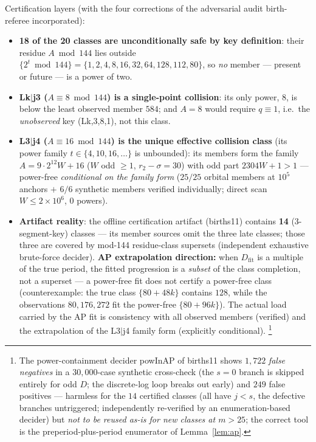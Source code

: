 \documentclass[11pt]{amsart}
\theoremstyle{definition}
\begin{document}
Certification layers (with the four corrections of the adversarial audit
birth-referee incorporated):
\begin{itemize}
\item \textbf{18 of the 20 classes are unconditionally safe by key
definition}: their residue $A\bmod144$ lies outside
$\{2^{t}\bmod144\}=\{1,2,4,8,16,32,64,128,112,80\}$, so \emph{no} member ---
present or future --- is a power of two.
\item \textbf{Lk$|$j3 ($A\equiv8\bmod144$) is a single-point collision}: its
only power, $8$, is below the least observed member $584$; and $A=8$ would
require $q\equiv1$, i.e.\ the \emph{unobserved} key (Lk,3,8,1), not this
class.
\item \textbf{L3$|$j4 ($A\equiv16\bmod144$) is the unique effective
collision class} (its power family $t\in\{4,10,16,\dots\}$ is unbounded): its
members form the family $A=9\cdot2^{12}W+16$ ($W$ odd $\ge1$,
$r_2-\sigma=30$) with odd part $2304W+1>1$ --- power-free \emph{conditional
on the family form} ($25/25$ orbital members at $10^{5}$ anchors $+$ $6/6$
synthetic members verified individually; direct scan $W\le2\times10^{6}$, $0$
powers).
\item \textbf{Artifact reality}: the offline certification artifact
(births11) contains \textbf{14} (3-segment-key) classes --- its member
sources omit the three late classes; those three are covered by mod-144
residue-class supersets (independent exhaustive brute-force decider).
\textbf{AP extrapolation direction:} when $D_{\mathrm{fit}}$ is a multiple of
the true period, the fitted progression is a \emph{subset} of the class
completion, not a superset --- a power-free fit does not certify a power-free
class (counterexample: the true class $\{80+48k\}$ contains $128$, while the
observations $80,176,272$ fit the power-free $\{80+96k\}$). The actual load
carried by the AP fit is consistency with all observed members (verified) and
the extrapolation of the L3$|$j4 family form (explicitly conditional).
\footnote{The power-containment decider powInAP of births11 shows
$1{,}722$ \emph{false negatives} in a $30{,}000$-case synthetic cross-check
(the $s{=}0$ branch is skipped entirely for odd $D$; the discrete-log loop
breaks out early) and $249$ false positives --- harmless for the $14$
certified classes (all have $j<s$, the defective branches untriggered;
independently re-verified by an enumeration-based decider) but \emph{not to
be reused as-is for new classes at $m>25$}; the correct tool is the
preperiod-plus-period enumerator of Lemma~\ref{lem:ap}.}
\end{itemize}
\end{document}
